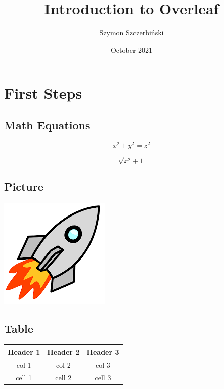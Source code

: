 \documentclass{article}
\title{Introduction to Overleaf}
\author{Szymon Szczerbiński}
\date{October 2021}
\begin{document}
\maketitle

\section{First Steps}

    \subsection{Math Equations}
    
        \[ x^2 + y^2 = z^2 \]
    
        \[\sqrt{x^2 + 1}\]
    
    \subsection{Picture}
    
        \begin{center}
            \includegraphics{rocket}
        \end{center}
    
    \subsection{Table}

        \begin{center}
            \begin{tabular}{ || c | c | c || }
                 \hline
                 Header 1 & Header 2 & Header 3 \\
                 \hline \hline
                 col 1 & col 2 & col 3 \\
                 \hline
                 cell 1 & cell 2 & cell 3 \\
                 \hline
            \end{tabular}
        \end{center}
\end{document}
